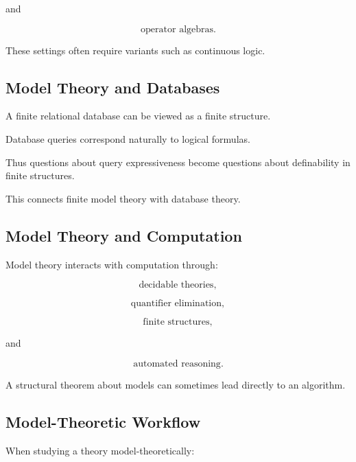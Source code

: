 and

\[
\boxed{
\text{operator algebras}.
}
\]

These settings often require variants such as continuous logic.

\subsection{Model Theory and Databases}
\label{subsec:model-theory-databases}

A finite relational database can be viewed as a finite structure.

Database queries correspond naturally to logical formulas.

Thus questions about query expressiveness become questions about definability
in finite structures.

This connects finite model theory with database theory.

\subsection{Model Theory and Computation}
\label{subsec:model-theory-computation}

Model theory interacts with computation through:

\[
\boxed{
\text{decidable theories},
}
\]

\[
\boxed{
\text{quantifier elimination},
}
\]

\[
\boxed{
\text{finite structures},
}
\]

and

\[
\boxed{
\text{automated reasoning}.
}
\]

A structural theorem about models can sometimes lead directly to an
algorithm.

\subsection{Model-Theoretic Workflow}
\label{subsec:model-theory-workflow}

When studying a theory model-theoretically:

